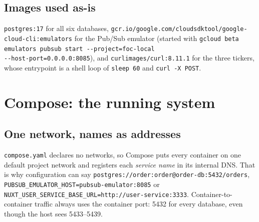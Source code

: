 \documentclass[11pt,a4paper]{article}
\newcommand{\code}[1]{\nolinkurl{#1}}
\begin{document}
\subsection{Images used as-is}

\code{postgres:17} for all six databases,
\code{gcr.io/google.com/cloudsdktool/google-cloud-cli:emulators} for the Pub/Sub emulator
(started with \code{gcloud beta emulators pubsub start --project=foc-local
--host-port=0.0.0.0:8085}), and \code{curlimages/curl:8.11.1} for the three tickers,
whose entrypoint is a shell loop of \code{sleep 60} and \code{curl -X POST}.

\section{Compose: the running system}
\label{sec:compose}

\subsection{One network, names as addresses}
\label{sec:network}

\code{compose.yaml} declares no networks, so Compose puts every container on one default
project network and registers each \emph{service name} in its internal DNS. That is why
configuration can say \code{postgres://order:order@order-db:5432/orders},
\code{PUBSUB_EMULATOR_HOST=pubsub-emulator:8085} or
\code{NUXT_USER_SERVICE_BASE_URL=http://user-service:3333}. Container-to-container
traffic always uses the container port: 5432 for every database, even though the host
sees 5433--5439.
\end{document}
